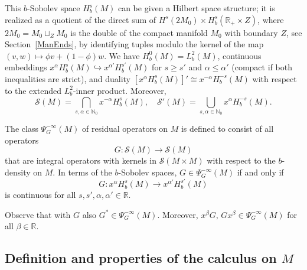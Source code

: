 \documentclass[reqno]{amsart}
\numberwithin{equation}{section}
\theoremstyle{definition}
\def\N{\mathbb N}
\def\R{\mathbb R}
\def\S{\mathscr S}
\begin{document}
This $b$-Sobolev space $H^s_b(M)$ can be given a Hilbert space structure; it is realized as a quotient of the direct sum of $H^s(2M_0) \times H^s_b(\R_+\times Z)$, where $2M_0 = M_0 \sqcup_{Z} M_0$ is the double of the compact manifold $M_0$ with boundary $Z$, see Section~\ref{ManEnds}, by identifying tuples modulo the kernel of the map $(v,w) \mapsto \phi v + (1-\phi)w$. We have $H^0_b(M) = L^2_b(M)$, continuous embeddings $x^{\alpha}H^s_b(M) \hookrightarrow x^{\alpha'}H^{s'}_b(M)$ for $s \geq s'$ and $\alpha \leq \alpha'$ (compact if both inequalities are strict), and duality $[x^{\alpha}H^s_b(M)]' \cong x^{-\alpha}H^{-s}_b(M)$ with respect to the extended $L^2_b$-inner product. Moreover,
$$
\S(M) = \bigcap\limits_{s,\alpha \in \N_0}x^{-\alpha}H^s_b(M), \quad \S'(M) = \bigcup\limits_{s,\alpha \in \N_0}x^{\alpha}H^{-s}_b(M).
$$

\medskip

\noindent
The class $\Psi^{-\infty}_G(M)$ of residual operators on $M$ is defined to consist of all operators
$$
G : \S(M) \to \S(M)
$$
that are integral operators with kernels in $\S(M\times M)$ with respect to the $b$-density on $M$. In terms of the $b$-Sobolev spaces, $G \in \Psi^{-\infty}_G(M)$ if and only if
$$
G : x^{\alpha}H^s_b(M) \to x^{\alpha'}H^{s'}_b(M)
$$
is continuous for all $s,s',\alpha,\alpha' \in \R$.

Observe that with $G$ also $G^* \in \Psi^{-\infty}_G(M)$. Moreover, $x^{\beta}G,\, G x^{\beta} \in \Psi^{-\infty}_G(M)$ for all $\beta \in \R$.

\subsection{Definition and properties of the calculus on {\boldmath $M$}}
\end{document}
